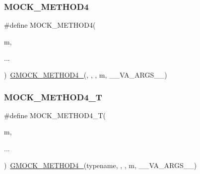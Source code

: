\mbox{\label{_obj__test_2lib_2googletest-release-1_88_81_2googlemock_2include_2gmock_2gmock-generated-function-mockers_8h_a111d70ee62b09089ec3cd7d6662e5cd2}} 
\subsubsection{\texorpdfstring{MOCK\_METHOD4}{MOCK\_METHOD4}}
{\footnotesize\ttfamily \#define M\+O\+C\+K\+\_\+\+M\+E\+T\+H\+O\+D4(\begin{DoxyParamCaption}\item[{}]{m,  }\item[{}]{... }\end{DoxyParamCaption})~\mbox{\hyperlink{_obj__test_2lib_2googletest-release-1_88_81_2googlemock_2include_2gmock_2gmock-generated-function-mockers_8h_ab6430f2cfad9de4aca5258ea559294bb}{G\+M\+O\+C\+K\+\_\+\+M\+E\+T\+H\+O\+D4\+\_\+}}(, , , m, \+\_\+\+\_\+\+V\+A\+\_\+\+A\+R\+G\+S\+\_\+\+\_\+)}

\mbox{\label{_obj__test_2lib_2googletest-release-1_88_81_2googlemock_2include_2gmock_2gmock-generated-function-mockers_8h_a17dde4ac8109f0bf1b73e3509e42c879}} 
\subsubsection{\texorpdfstring{MOCK\_METHOD4\_T}{MOCK\_METHOD4\_T}}
{\footnotesize\ttfamily \#define M\+O\+C\+K\+\_\+\+M\+E\+T\+H\+O\+D4\+\_\+T(\begin{DoxyParamCaption}\item[{}]{m,  }\item[{}]{... }\end{DoxyParamCaption})~\mbox{\hyperlink{_obj__test_2lib_2googletest-release-1_88_81_2googlemock_2include_2gmock_2gmock-generated-function-mockers_8h_ab6430f2cfad9de4aca5258ea559294bb}{G\+M\+O\+C\+K\+\_\+\+M\+E\+T\+H\+O\+D4\+\_\+}}(typename, , , m, \+\_\+\+\_\+\+V\+A\+\_\+\+A\+R\+G\+S\+\_\+\+\_\+)}

